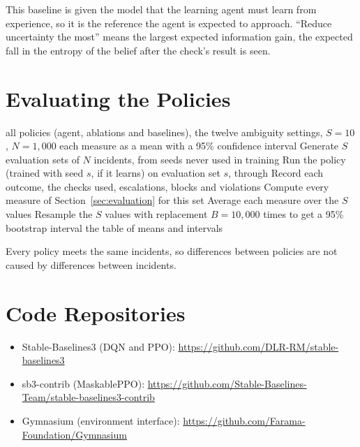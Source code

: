 This baseline is given the model that the learning agent must learn from experience, so it is the reference the agent is expected to approach. ``Reduce uncertainty the most'' means the largest expected information gain, the expected fall in the entropy of the belief after the check's result is seen.

\section{Evaluating the Policies}

\begin{algorithm}[H]
\caption{Evaluation protocol}
\label{alg:evaluation}
\begin{algorithmic}[1]
\Require all policies (agent, ablations and baselines), the twelve ambiguity settings, $S = 10$, $N = 1{,}000$
\Ensure each measure as a mean with a 95\% confidence interval
  \State Generate $S$ evaluation sets of $N$ incidents, from seeds never used in training
\EndFor
{}
    \State Run the policy (trained with seed $s$, if it learns) on evaluation set $s$, through 
    \State Record each outcome, the checks used, escalations, blocks and violations
    \State Compute every measure of Section~\ref{sec:evaluation} for this set
  \EndFor
  \State Average each measure over the $S$ values
  \State Resample the $S$ values with replacement $B = 10{,}000$ times to get a 95\% bootstrap interval
\EndFor
\State \Return the table of means and intervals
\end{algorithmic}
\end{algorithm}

Every policy meets the same incidents, so differences between policies are not caused by differences between incidents.

\section{Code Repositories}

\begin{itemize}
\item Stable-Baselines3 (DQN and PPO): \url{https://github.com/DLR-RM/stable-baselines3}
\item sb3-contrib (MaskablePPO): \url{https://github.com/Stable-Baselines-Team/stable-baselines3-contrib}
\item Gymnasium (environment interface): \url{https://github.com/Farama-Foundation/Gymnasium}
\end{itemize}
